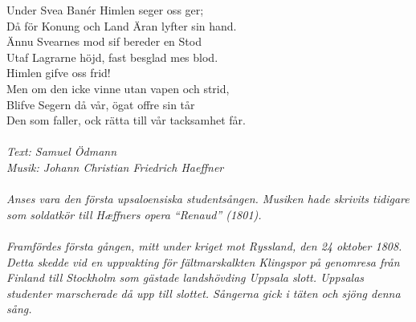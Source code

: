 \vspace{10pt}
Under Svea Banér Himlen seger oss ger;\\
Då för Konung och Land Äran lyfter sin hand.\\
Ännu Svearnes mod sif bereder en Stod\\
Utaf Lagrarne höjd, fast besglad mes blod.\\
Himlen gifve oss frid!\\
Men om den icke vinne utan vapen och strid,\\
Blifve Segern då vår, ögat offre sin tår\\
Den som faller, ock rätta till vår tacksamhet får.\\
\\
{\footnotesize\textit{Text: Samuel Ödmann\\ Musik: Johann Christian
Friedrich Haeffner\\
\\
Anses vara den första upsaloensiska studentsången. Musiken hade
skrivits tidigare som soldatkör till Hæffners opera “Renaud”
(1801).\\
\\
Framfördes första gången, mitt under kriget mot Ryssland,
den 24 oktober 1808. Detta skedde vid en
uppvakting för fältmarskalkten Klingspor på genomresa från Finland
till Stockholm som gästade landshövding Uppsala slott.  Uppsalas
studenter marscherade då upp till slottet. Sångerna gick i täten och
sjöng denna sång.}}
